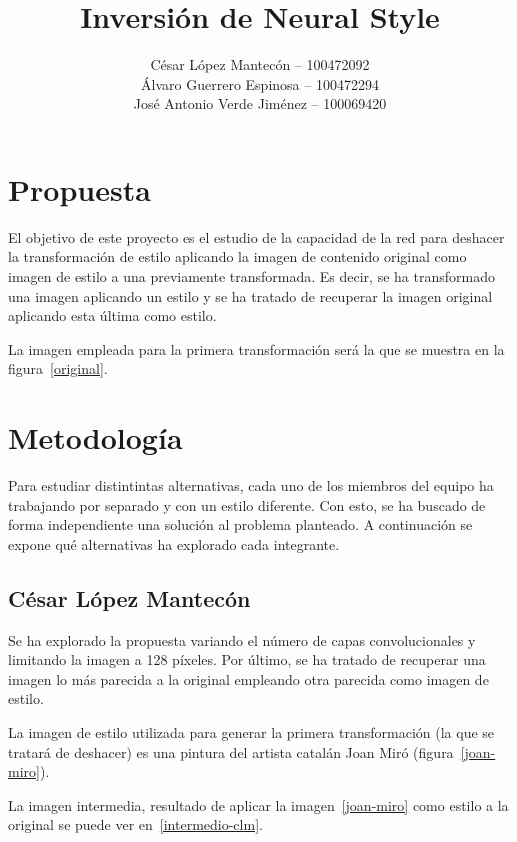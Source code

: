 \documentclass[es]{uc3mreport}
\author{
    César López Mantecón  -- 100472092\\
    Álvaro Guerrero Espinosa -- 100472294\\
    José Antonio Verde Jiménez -- 100069420}
\title{Inversión de Neural Style}
\begin{document}
    \makecover


    \begin{report}
        \section{Propuesta}
        El objetivo de este proyecto es el estudio de la capacidad de la red
        para deshacer la transformación de estilo aplicando la imagen de
            contenido original como imagen de estilo a una previamente
            transformada. Es decir, se ha transformado una imagen aplicando un
            estilo y se ha tratado de recuperar la imagen original aplicando
            esta última como estilo.

        La imagen empleada para la primera transformación será la que se muestra en la figura~\ref{original}.


        \section{Metodología}
        Para estudiar distintintas alternativas, cada uno de los miembros del
        equipo ha trabajando por separado y con un estilo diferente. Con esto, se ha buscado de forma
        independiente una solución al problema planteado. A continuación se
        expone qué alternativas ha explorado cada integrante.

            

            \subsection{César López Mantecón}
            Se ha explorado la propuesta variando el número de capas
            convolucionales y limitando la imagen a 128 píxeles. Por último, se
            ha tratado de recuperar una imagen lo más parecida a la original
            empleando otra parecida como imagen de estilo.

            La imagen de estilo utilizada para generar la primera
            transformación (la que se tratará de deshacer) es una pintura del
            artista catalán Joan Miró (figura~\ref{joan-miro}).

            La imagen intermedia, resultado de aplicar la
            imagen~\ref{joan-miro} como estilo a la original se puede ver
            en~\ref{intermedio-clm}.


\end{report}
\end{document}

